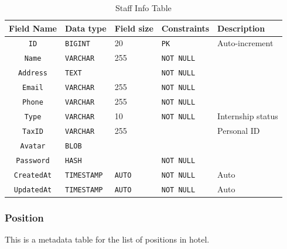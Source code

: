 \begin{table}[H]
	\centering
	\begin{tabular}{cllll}
		\hline
		Field Name & Data type & Field size & Constraints & Description \\ \hline
		\texttt{ID} & \texttt{BIGINT} & 20 & \texttt{PK} & Auto-increment \\
		\texttt{Name} & \texttt{VARCHAR} & 255 & \texttt{NOT NULL} &  \\
		\texttt{Address} & \texttt{TEXT} & & \texttt{NOT NULL} &  \\
		\texttt{Email} & \texttt{VARCHAR} & 255 & \texttt{NOT NULL} &  \\
		\texttt{Phone} & \texttt{VARCHAR} & 255 & \texttt{NOT NULL} &  \\
		\texttt{Type} & \texttt{VARCHAR} & 10 & \texttt{NOT NULL} & Internship status  \\
		\texttt{TaxID} & \texttt{VARCHAR} & 255 & & Personal ID \\
		\texttt{Avatar} & \texttt{BLOB} &  & &  \\
		\texttt{Password} & \texttt{HASH} &  & \texttt{NOT NULL} &  \\
		
		\texttt{CreatedAt} & \texttt{TIMESTAMP} & \texttt{AUTO} & \texttt{NOT NULL} & Auto \\
		\texttt{UpdatedAt} & \texttt{TIMESTAMP} & \texttt{AUTO} & \texttt{NOT NULL} & Auto \\
		\hline
	\end{tabular}
	\caption{Staff Info Table}
\end{table}

\subsubsection{Position}

This is a metadata table for the list of positions in hotel.

